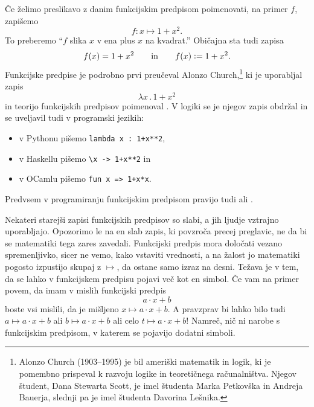 Če želimo preslikavo z danim funkcijskim predpisom poimenovati, na primer $f$, zapišemo
%
\begin{equation*}
  f : x \mapsto 1 + x^2.
\end{equation*}
%
To preberemo ``$f$ slika $x$ v ena plus $x$ na kvadrat.'' Običajna sta tudi zapisa
%
\begin{equation*}
  f(x) = 1 + x^2
  \qquad\text{in}\qquad
  f(x) \mathrel{\mathop:}= 1 + x^2.
\end{equation*}
%
Funkcijske predpise je podrobno prvi preučeval Alonzo Church,\footnote{Alonzo Church
  (1903--1995) je bil ameriški matematik in logik, ki je pomembno prispeval k razvoju
  logike in teoretičnega računalništva. Njegov študent, Dana Stewarta Scott, je imel
  študenta Marka Petkovška in Andreja Bauerja, slednji pa je imel študenta Davorina
  Lešnika.} ki je uporabljal zapis
%
\begin{equation*}
  \lambda x \,.\, 1 + x^2
\end{equation*}
%
in teorijo funkcijskih predpisov poimenoval . V logiki se je njegov
zapis obdržal in se uveljavil tudi v programski jezikih:
%
\begin{itemize}
\item v Pythonu pišemo \verb|lambda x : 1+x**2|,
\item v Haskellu pišemo \verb|\x -> 1+x**2| in
\item v OCamlu pišemo \verb|fun x => 1+x*x|.
\end{itemize}
%
Predvsem v programiranju funkcijskim predpisom pravijo tudi  ali .

Nekateri starejši zapisi funkcijskih predpisov so slabi, a jih ljudje vztrajno
uporabljajo. Opozorimo le na en slab zapis, ki povzroča precej preglavic, ne da bi se
matematiki tega zares zavedali. Funkcijski predpis mora določati vezano spremenljivko,
sicer ne vemo, kako vstaviti vrednosti, a na žalost jo matematiki pogosto izpustijo skupaj
z $\mapsto$, da ostane samo izraz na desni.
%
Težava je v tem, da se lahko v funkcijskem predpisu pojavi več kot en simbol. Če vam na primer povem, da imam v mislih funkcijski predpis
%
\begin{equation*}
  a \cdot x + b
\end{equation*}
%
boste vsi mislili, da je mišljeno $x \mapsto a \cdot x + b$. A pravzprav bi lahko bilo
tudi $a \mapsto a \cdot x + b$ ali $b \mapsto a \cdot x + b$ ali celo
$t \mapsto a \cdot x + b$! Namreč, nič ni narobe s funkcijskim predpisom, v katerem se
pojavijo dodatni simboli.

